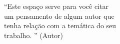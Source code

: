 \begin{epigrafe}
    \vspace*{\fill}
	\begin{flushright}
		“Este espaço serve para você citar \\
		 um pensamento de algum autor que  \\
		 tenha relação com a temática do seu \\
		 trabalho. ”
		(Autor)
	\end{flushright}
\end{epigrafe}